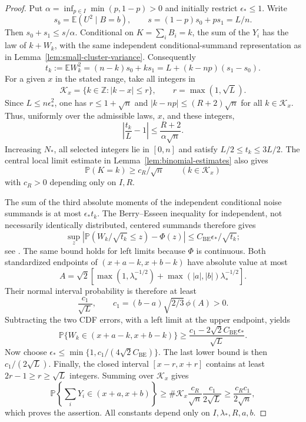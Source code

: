 \documentclass[aop]{imsart}
\theoremstyle{plain}
\theoremstyle{definition}
\theoremstyle{definition}
\newcommand{\PP}{\mathbb P}
\newcommand{\EE}{\mathbb E}
\begin{document}
\begin{proof}
Put $\alpha=\inf_{p\in I}\min(p,1-p)>0$ and initially restrict
$\epsilon_*\le1$. Write
\[
 s_b=\EE(U^2\mid B=b),\qquad s=(1-p)s_0+ps_1=L/n.
\]
Then $s_0+s_1\le s/\alpha$. Conditional on
$K=\sum_iB_i=k$, the sum of the $Y_i$ has the law of $k+W_k$,
with the same independent conditional-summand representation as in
Lemma~\ref{lem:small-cluster-variance}. Consequently
\[
 t_k:=\EE W_k^2=(n-k)s_0+ks_1
     =L+(k-np)(s_1-s_0).
\]
For a given $x$ in the stated range, take all integers in
\[
 \mathcal K_x=\{k\in\mathbb Z:|k-x|\le r\},\qquad
 r=\max(1,\sqrt L).
\]
Since $L\le n\epsilon_*^2$, one has $r\le1+\sqrt n$ and
$|k-np|\le(R+2)\sqrt n$ for all $k\in\mathcal K_x$.
Thus, uniformly over the admissible laws, $x$, and these integers,
\[
 \left|\frac{t_k}{L}-1\right|
 \le\frac{R+2}{\alpha\sqrt n}.
\]
Increasing $N_*$, all selected integers lie in $[0,n]$ and satisfy
$L/2\le t_k\le3L/2$. The central local limit estimate in
Lemma~\ref{lem:binomial-estimates} also gives
\[
 \PP(K=k)\ge c_R/\sqrt n\qquad(k\in\mathcal K_x)
\]
with $c_R>0$ depending only on $I,R$.

The sum of the third absolute moments of the independent conditional
noise summands is at most $\epsilon_*t_k$. The Berry--Esseen
inequality for independent, not necessarily identically distributed,
centered summands therefore gives
\[
 \sup_z\left|\PP(W_k/\sqrt{t_k}\le z)-\Phi(z)\right|
 \le C_{\mathrm{BE}}\epsilon_*/\sqrt{t_k};
\]
see \cite[pp.~124--125]{Shevtsova2013}. The same bound holds for left limits because
$\Phi$ is continuous. Both standardized endpoints of
$(x+a-k,x+b-k)$ have absolute value at most
\[
 A=\sqrt2\left[
       \max(1,\lambda_*^{-1/2})
       +\max(|a|,|b|)\lambda_*^{-1/2}\right].
\]
Their normal interval probability is therefore at least
\[
 \frac{c_1}{\sqrt L},\qquad
 c_1=(b-a)\sqrt{2/3}\,\phi(A)>0.
\]
Subtracting the two CDF errors, with a left limit at the upper
endpoint, yields
\[
 \PP\{W_k\in(x+a-k,x+b-k)\}
 \ge\frac{c_1-2\sqrt2 C_{\mathrm{BE}}\epsilon_*}{\sqrt L}.
\]
Now choose
$\epsilon_*\le\min\{1,c_1/(4\sqrt2 C_{\mathrm{BE}})\}$.
The last lower bound is then $c_1/(2\sqrt L)$.
Finally, the closed interval $[x-r,x+r]$ contains at least
$2r-1\ge r\ge\sqrt L$ integers. Summing over $\mathcal K_x$ gives
\[
 \PP\left\{\sum_iY_i\in(x+a,x+b)\right\}
 \ge \#\mathcal K_x\frac{c_R}{\sqrt n}
             \frac{c_1}{2\sqrt L}
 \ge\frac{c_Rc_1}{2\sqrt n},
\]
which proves the assertion. All constants depend only on
$I,\lambda_*,R,a,b$.
\end{proof}
\end{document}
